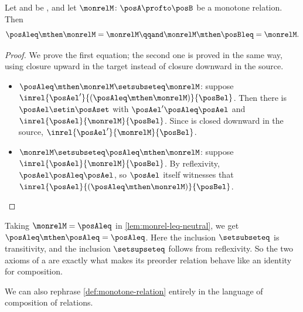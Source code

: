 \begin{lemma}
    \label{lem:monrel-leq-neutral}
    Let \posA and \posB be , and let $\monrelM \colon \posA \profto \posB$ be a monotone relation.
    Then
    \begin{equation}
        \posAleq \mthen \monrelM = \monrelM
        \qqand
        \monrelM \mthen \posBleq = \monrelM.
    \end{equation}
\end{lemma}
\begin{proof}
    We prove the first equation; the second one is proved in the same way, using closure upward in the target instead of closure downward in the source.
    \begin{itemize}
        \item $\posAleq \mthen \monrelM \setsubseteq \monrelM$: suppose $\inrel{\posAel'}{(\posAleq \mthen \monrelM)}{\posBel}$.
              Then there is $\posAel \setin \posAset$ with $\posAel' \posAleq \posAel$ and $\inrel{\posAel}{\monrelM}{\posBel}$.
              Since \monrelM is closed downward in the source, $\inrel{\posAel'}{\monrelM}{\posBel}$.
        \item $\monrelM \setsubseteq \posAleq \mthen \monrelM$: suppose $\inrel{\posAel}{\monrelM}{\posBel}$.
              By reflexivity, $\posAel \posAleq \posAel$, so $\posAel$ itself witnesses that $\inrel{\posAel}{(\posAleq \mthen \monrelM)}{\posBel}$.
    \end{itemize}
\end{proof}

\begin{remark}
    Taking $\monrelM = \posAleq$ in \cref{lem:monrel-leq-neutral}, we get $\posAleq \mthen \posAleq = \posAleq$.
    Here the inclusion $\setsubseteq$ is transitivity, and the inclusion $\setsupseteq$ follows from reflexivity.
    So the two axioms of a  are exactly what makes its preorder relation behave like an identity for composition.
\end{remark}

We can also rephrase \cref{def:monotone-relation} entirely in the language of composition of relations.

